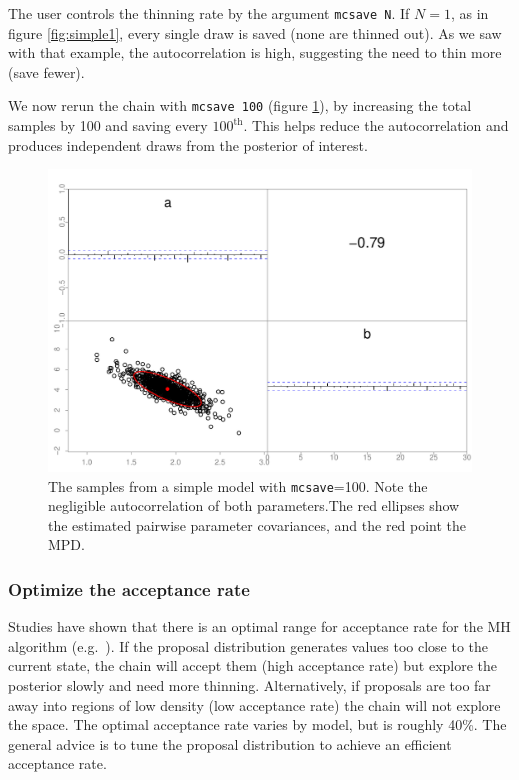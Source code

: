 \documentclass{article}\usepackage[]{graphicx}\usepackage[]{color}
\begin{document}
The user controls the thinning rate by the argument
\texttt{mcsave N}. If $N=1$, as in figure \ref{fig:simple1},
every single draw is saved (none are thinned out). As we saw
with that example, the autocorrelation is high, suggesting
the need to thin more (save fewer).

We now rerun the chain with \texttt{mcsave 100} (figure
\ref{fig:simple2}), by increasing the total samples by
100 and saving every $100^{\text{th}}$. This helps reduce
the autocorrelation and produces independent draws from the
posterior of interest.
\begin{figure}[h]
  \centering
  \includegraphics[width=5in]{../plots/simple2.pdf}
  \caption{The samples from a simple model with
    \texttt{mcsave}=100. Note the negligible autocorrelation
    of both parameters.The red ellipses show the estimated
    pairwise parameter covariances, and the red point the
    MPD.}
  \label{fig:simple2}
\end{figure}


\subsubsection{Optimize the acceptance rate}
Studies have shown that there is an optimal range for
acceptance rate for the MH algorithm
(e.g.\ \cite{roberts2001}). If the proposal distribution
generates values too close to the current state, the chain
will accept them (high acceptance rate) but explore the
posterior slowly and need more thinning. Alternatively, if
proposals are too far away into regions of low density (low
acceptance rate) the chain will not explore the space. The
optimal acceptance rate varies by model, but is roughly
40\%. The general advice is to tune the proposal
distribution to achieve an efficient acceptance rate.
\end{document}
